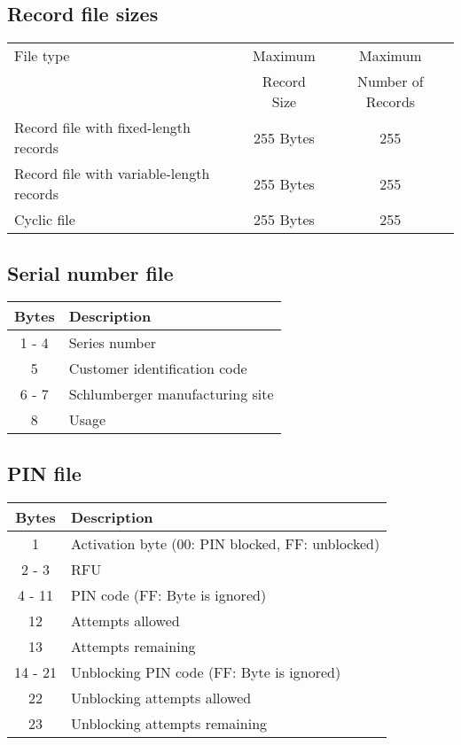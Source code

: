 \documentclass[a4paper,oneside]{article}
\begin{document}
\subsection{Record file sizes}

\begin{center}
\begin{tabular}{|l|c|c|} \hline
File type & Maximum & Maximum \\
 & Record Size & Number of Records \\ \hline \hline
Record file with fixed-length records & 255 Bytes & 255 \\ \hline
Record file with variable-length records & 255 Bytes & 255 \\ \hline
Cyclic file & 255 Bytes & 255 \\ \hline
\end{tabular}
\end{center}

\subsection{Serial number file}

\begin{center}
\begin{tabular}{|c|l|} \hline
Bytes & Description \\ \hline \hline
1 - 4 & Series number \\ \hline
5     & Customer identification code \\ \hline
6 - 7 & Schlumberger manufacturing site \\ \hline
8     & Usage \\ \hline
\end{tabular}
\end{center}

\subsection{PIN file}

\begin{center}
\begin{tabular}{|c|l|} \hline
Bytes & Description \\ \hline \hline
1     & Activation byte (00: PIN blocked, FF: unblocked) \\ \hline
2 - 3 & RFU \\ \hline
4 - 11 & PIN code (FF: Byte is ignored) \\ \hline
12    & Attempts allowed \\ \hline
13    & Attempts remaining \\ \hline
14 - 21 & Unblocking PIN code (FF: Byte is ignored) \\ \hline
22    & Unblocking attempts allowed \\ \hline
23    & Unblocking attempts remaining \\ \hline
\end{tabular}
\end{center}
\end{document}
